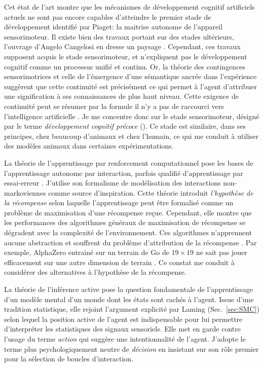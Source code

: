 \noindent
Cet état de l'art montre que les mécanismes de développement cognitif artificiels actuels ne sont pas encore capables d'atteindre le premier stade de développement identifié par Piaget: la maitrise autonome de l'appareil sensorimoteur. 
Il existe bien des travaux portant sur des stades ultérieurs,
l'ouvrage d'Angelo Cangelosi  en dresse un paysage \cite{cangelosi_developmental_2015}.
Cependant, ces travaux supposent acquis le stade sensorimoteur, et n'expliquent pas le développement cognitif comme un processus unifié et continu.
Or, la théorie des contingences sensorimotrices et celle de l'émergence d'une sémantique ancrée dans l'expérience suggèrent que cette continuité est précisément ce qui permet à l'agent d'attribuer une signification à ses connaissances de plus haut niveau. 
Cette exigence de continuité peut se résumer par la formule \og il n'y a pas de raccourci vers l'intelligence artificielle \fg .
Je me concentre donc sur le stade sensorimoteur, désigné par le terme \emph{développement cognitif précoce} ().
Ce stade est similaire, dans ses principes, chez beaucoup d'animaux et chez l'humain, ce qui me conduit à utiliser des modèles animaux dans certaines expérimentations. 

La théorie de l'apprentissage par renforcement computationnel pose les bases de l'apprentissage autonome par interaction, parfois qualifié \og d'apprentissage par essai-erreur \fg{}.
J'utilise son formalisme de modélisation des interactions non-markoviennes comme source d'inspiration.
Cette théorie introduit \emph{l'hypothèse de la récompense} selon laquelle l'apprentissage peut être formalisé comme un problème de maximisation d'une récompense reçue.
Cependant, elle montre que les performances des algorithmes généraux de maximisation de récompense se dégradent avec la complexité de l'environnement. 
Ces algorithmes n'apprennent aucune abstraction et souffrent du problème d'attribution de la récompense \cite{minsky_steps_1961}. 
Par exemple, AlphaZero entrainé sur un terrain de Go de $19 \times 19$ ne sait pas jouer efficacement sur une autre dimension de terrain \cite{fujita_alphavit_2025}. 
Ce constat me conduit à considérer des alternatives à l'hypothèse de la récompense.

La théorie de l'inférence active pose la question fondamentale de l'apprentissage d'un modèle mental d'un monde dont les états sont cachés à l'agent.
Issue d'une tradition statistique, elle rejoint l'argument explicité par Laming (Sec.~\ref{sec:SMC}) selon lequel la position active de l'agent est indispensable pour lui permettre d'interpréter les statistiques des signaux sensoriels.
Elle met en garde contre l'usage du terme \emph{action} qui suggère une intentionnalité de l'agent. 
J'adopte le terme plus psychologiquement neutre de \emph{décision} en insistant sur son rôle premier pour la sélection de boucles d'interaction.  

